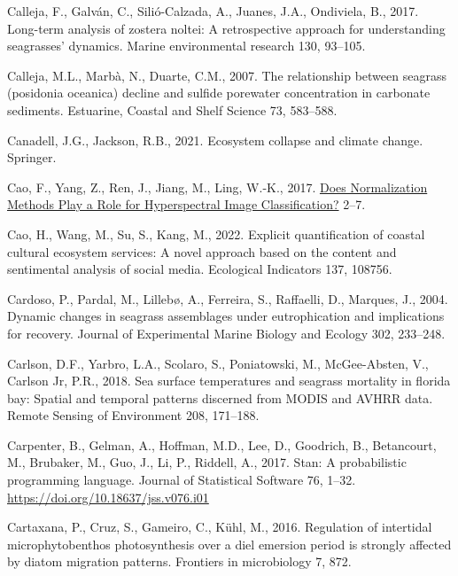 \documentclass[
  letterpaper,
  11pt,
  english,
  singlespacing,
  headsepline]{MastersDoctoralThesis}
\newlength{\cslhangindent}
\newenvironment{CSLReferences}[2] %
 {\begin{list}{}{%
  \setlength{\itemindent}{0pt}
  \setlength{\leftmargin}{0pt}
  \setlength{\parsep}{0pt}
  \ifodd #1
   \setlength{\leftmargin}{\cslhangindent}
   \setlength{\itemindent}{-1\cslhangindent}
  \fi
  \setlength{\itemsep}{#2\baselineskip}}}
 {\end{list}}
\begin{document}
\begin{CSLReferences}{1}{0}
Calleja, F., Galván, C., Silió-Calzada, A., Juanes, J.A., Ondiviela, B.,
2017. Long-term analysis of zostera noltei: A retrospective approach for
understanding seagrasses' dynamics. Marine environmental research 130,
93--105.

Calleja, M.L., Marbà, N., Duarte, C.M., 2007. The relationship between
seagrass (posidonia oceanica) decline and sulfide porewater
concentration in carbonate sediments. Estuarine, Coastal and Shelf
Science 73, 583--588.

Canadell, J.G., Jackson, R.B., 2021. Ecosystem collapse and climate
change. Springer.

Cao, F., Yang, Z., Ren, J., Jiang, M., Ling, W.-K., 2017.
\href{http://arxiv.org/abs/1710.02939}{{Does Normalization Methods Play
a Role for Hyperspectral Image Classification?}} 2--7.

Cao, H., Wang, M., Su, S., Kang, M., 2022. Explicit quantification of
coastal cultural ecosystem services: A novel approach based on the
content and sentimental analysis of social media. Ecological Indicators
137, 108756.

Cardoso, P., Pardal, M., Lillebø, A., Ferreira, S., Raffaelli, D.,
Marques, J., 2004. Dynamic changes in seagrass assemblages under
eutrophication and implications for recovery. Journal of Experimental
Marine Biology and Ecology 302, 233--248.

Carlson, D.F., Yarbro, L.A., Scolaro, S., Poniatowski, M., McGee-Absten,
V., Carlson Jr, P.R., 2018. Sea surface temperatures and seagrass
mortality in florida bay: Spatial and temporal patterns discerned from
MODIS and AVHRR data. Remote Sensing of Environment 208, 171--188.

Carpenter, B., Gelman, A., Hoffman, M.D., Lee, D., Goodrich, B.,
Betancourt, M., Brubaker, M., Guo, J., Li, P., Riddell, A., 2017. Stan:
A probabilistic programming language. Journal of Statistical Software
76, 1--32. \url{https://doi.org/10.18637/jss.v076.i01}

Cartaxana, P., Cruz, S., Gameiro, C., Kühl, M., 2016. Regulation of
intertidal microphytobenthos photosynthesis over a diel emersion period
is strongly affected by diatom migration patterns. Frontiers in
microbiology 7, 872.


\end{CSLReferences}
\end{document}
